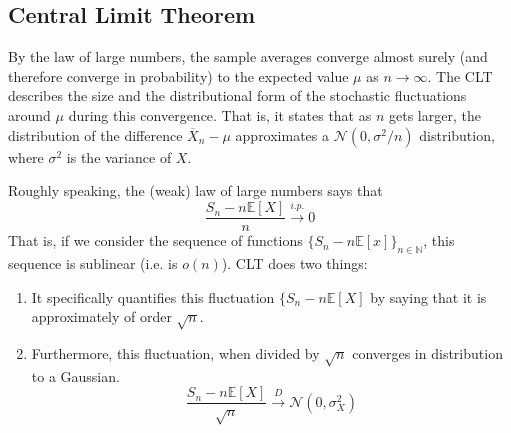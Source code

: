 \documentclass{article}
\begin{document}
  \subsection{Central Limit Theorem}

    By the law of large numbers, the sample averages converge almost surely (and therefore converge in probability) to the expected value $\mu$ as $n \rightarrow \infty$. The CLT describes the size and the distributional form of the stochastic fluctuations around $\mu$ during this convergence. That is, it states that as $n$ gets larger, the distribution of the difference $\overline{X}_n - \mu$ approximates a $\mathcal{N}(0, \sigma^2 / n)$ distribution, where $\sigma^2$ is the variance of $X$. 


    Roughly speaking, the (weak) law of large numbers says that 
    \begin{equation}
      \frac{S_n - n \mathbb{E}[X]}{n} \xrightarrow{i.p.} 0
    \end{equation}
    That is, if we consider the sequence of functions $\{S_n - n \mathbb{E}[x]\}_{n \in \mathbb{N}}$, this sequence is sublinear (i.e. is $o(n)$). CLT does two things: 
    \begin{enumerate}
      \item It specifically quantifies this fluctuation $\{S_n - n \mathbb{E}[X]$ by saying that it is approximately of order $\sqrt{n}$. 
      \item Furthermore, this fluctuation, when divided by $\sqrt{n}$ converges in distribution to a Gaussian. 
      \begin{equation}
        \frac{S_n - n \mathbb{E}[X]}{\sqrt{n}} \xrightarrow{D} \mathcal{N}(0, \sigma_X^2)
      \end{equation}
    \end{enumerate}
\end{document}
